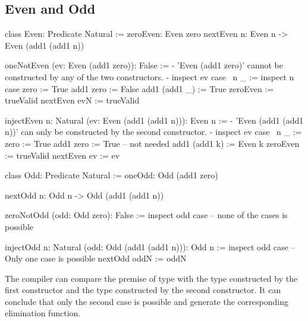 \vskip 5mm
\subsection{Even and Odd}



\begin{alba}
    class
        Even: Predicate Natural
    :=
        zeroEven: Even zero
        nextEven {n}: Even n -> Even (add1 (add1 n))



    oneNotEven (ev: Even (add1 zero)): False :=
        {- 'Even (add1 zero)' cannot be constructed by any of the
           two constructors. -}
        inspect ev case
            {\ {n} _ :=
                inspect n case
                    zero :=
                        True
                    add1 zero :=
                        False
                    add1 (add1 _) :=
                        True}
            zeroEven :=
                trueValid
            nextEven evN :=
                trueValid


    injectEven {n: Natural} (ev: Even (add1 (add1 n))): Even n :=
        {- 'Even (add1 (add1 n))' can only be constructed by the
           second constructor. -}
        inspect ev case
            {\ {n} _ :=
                zero :=
                    True
                add1 zero :=
                    True   -- not needed
                add1 (add1 k) :=
                    Even k}
            zeroEven :=
                trueValid
            nextEven ev :=
                ev
\end{alba}



\begin{alba}
    class
        Odd: Predicate Natural
    :=
        oneOdd: Odd (add1 zero)

        nextOdd {n}: Odd n -> Odd (add1 (add1 n))


    zeroNotOdd (odd: Odd zero): False :=
        inspect odd case
            -- none of the cases is possible

    injectOdd {n: Natural} (odd: Odd (add1 (add1 n))): Odd n :=
        inspect odd case
            -- Only one case is possible
            nextOdd oddN := oddN
\end{alba}

The compiler can compare the premise of type  with
the type  constructed by the first constructor and the
type  constructed by the second constructor. It can
conclude that only the second case is possible and generate the corresponding
elimination function.




